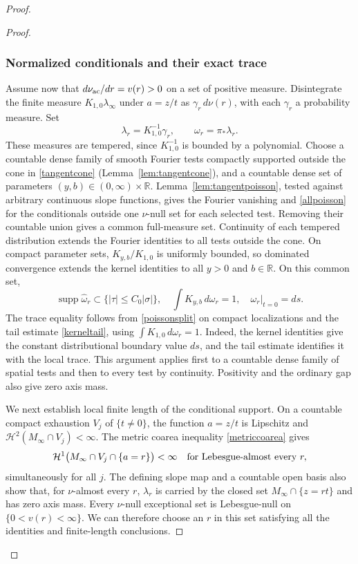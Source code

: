 \documentclass[11pt]{article}
\newcommand{\R}{\mathbb R}
\newcommand{\HH}{\mathcal H}
\newcommand{\supp}{\operatorname{supp}}
\begin{document}
\begin{proof}
\begin{proof}
\subsubsection{Normalized conditionals and their exact trace}
Assume now that $d\nu_{\rm ac}/dr=v(r)>0$ on a set of positive measure. Disintegrate the finite measure $K_{1,0}\lambda_\infty$ under $a=z/t$ as $\gamma_r\,d\nu(r)$, with each $\gamma_r$ a probability measure. Set
\[
 \lambda_r=K_{1,0}^{-1}\gamma_r,\qquad \omega_r=\pi_*\lambda_r.
\]
These measures are tempered, since $K_{1,0}^{-1}$ is bounded by a polynomial. Choose a countable dense family of smooth Fourier tests compactly supported outside the cone in \eqref{tangentcone} (Lemma~\ref{lem:tangentcone}), and a countable dense set of parameters $(y,b)\in(0,\infty)\times\R$. Lemma~\ref{lem:tangentpoisson}, tested against arbitrary continuous slope functions, gives the Fourier vanishing and \eqref{allpoisson} for the conditionals outside one $\nu$-null set for each selected test. Removing their countable union gives a common full-measure set. Continuity of each tempered distribution extends the Fourier identities to all tests outside the cone. On compact parameter sets, $K_{y,b}/K_{1,0}$ is uniformly bounded, so dominated convergence extends the kernel identities to all $y>0$ and $b\in\R$. On this common set,
\begin{equation}\label{conditionalidentities}
 \supp\widehat\omega_r\subset\{|\tau|\le C_0|\sigma|\},
 \quad \int K_{y,b}\,d\omega_r=1,
 \quad \omega_r|_{t=0}=ds.
\end{equation}
The trace equality follows from \eqref{poissonsplit} on compact localizations and the tail estimate \eqref{kerneltail}, using $\int K_{1,0}\,d\omega_r=1$. Indeed, the kernel identities give the constant distributional boundary value $ds$, and the tail estimate identifies it with the local trace. This argument applies first to a countable dense family of spatial tests and then to every test by continuity. Positivity and the ordinary gap also give zero axis mass.

We next establish local finite length of the conditional support. On a countable compact exhaustion $V_j$ of $\{t\ne0\}$, the function $a=z/t$ is Lipschitz and $\HH^2(M_\infty\cap V_j)<\infty$. The metric coarea inequality \eqref{metriccoarea} gives
\[
 \HH^1\bigl(M_\infty\cap V_j\cap\{a=r\}\bigr)<\infty
 \quad\hbox{for Lebesgue-almost every }r,
\]
simultaneously for all $j$. The defining slope map and a countable open basis also show that, for $\nu$-almost every $r$, $\lambda_r$ is carried by the closed set $M_\infty\cap\{z=rt\}$ and has zero axis mass. Every $\nu$-null exceptional set is Lebesgue-null on $\{0<v(r)<\infty\}$. We can therefore choose an $r$ in this set satisfying all the identities and finite-length conclusions.


\end{proof}
\end{proof}
\end{document}

